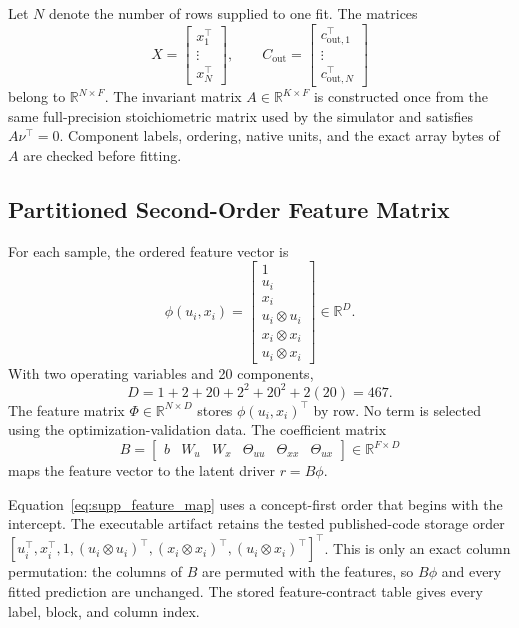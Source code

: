 \documentclass[a4paper,fleqn]{cas-sc}
\newcommand{\R}{\mathbb{R}}
\begin{document}
Let $N$ denote the number of rows supplied to one fit. The matrices
\begin{equation}
X=\begin{bmatrix}x_1^\top\\ \vdots\\x_N^\top\end{bmatrix},
\qquad
C_{\mathrm{out}}=\begin{bmatrix}c_{\mathrm{out},1}^\top\\ \vdots\\c_{\mathrm{out},N}^\top\end{bmatrix}
\end{equation}
belong to $\R^{N\times F}$. The invariant matrix $A\in\R^{K\times F}$ is constructed once from the same full-precision stoichiometric matrix used by the simulator and satisfies $A\nu^\top=0$. Component labels, ordering, native units, and the exact array bytes of $A$ are checked before fitting.

\subsection{Partitioned Second-Order Feature Matrix}

For each sample, the ordered feature vector is
\begin{equation}
\label{eq:supp_feature_map}
\phi(u_i,x_i)=
\begin{bmatrix}
1\\u_i\\x_i\\u_i\otimes u_i\\x_i\otimes x_i\\u_i\otimes x_i
\end{bmatrix}\in\R^D.
\end{equation}
With two operating variables and 20 components,
\begin{equation}
D=1+2+20+2^2+20^2+2(20)=467.
\end{equation}
The feature matrix $\Phi\in\R^{N\times D}$ stores $\phi(u_i,x_i)^\top$ by row. No term is selected using the optimization-validation data. The coefficient matrix
\begin{equation}
B=\begin{bmatrix}b&W_u&W_x&\Theta_{uu}&\Theta_{xx}&\Theta_{ux}\end{bmatrix}
\in\R^{F\times D}
\end{equation}
maps the feature vector to the latent driver $r=B\phi$.

Equation~\eqref{eq:supp_feature_map} uses a concept-first order that begins with the intercept. The executable artifact retains the tested published-code storage order $[u_i^\top,x_i^\top,1,(u_i\otimes u_i)^\top,(x_i\otimes x_i)^\top,(u_i\otimes x_i)^\top]^\top$. This is only an exact column permutation: the columns of $B$ are permuted with the features, so $B\phi$ and every fitted prediction are unchanged. The stored feature-contract table gives every label, block, and column index.
\end{document}
